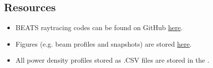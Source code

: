 \subsection{Resources}
\begin{itemize}
    \item BEATS raytracing codes can be found on GitHub \href{https://github.com/gianthk/BEATS_raytracing}{here}.
    \item Figures (e.g. beam profiles and snapshots) are stored \href{https://github.com/gianthk/BEATS_raytracing/tree/master/beam_profiles}{here}.
    \item All power density profiles stored as .CSV files are stored in the \powerprofilesurl.
\end{itemize}